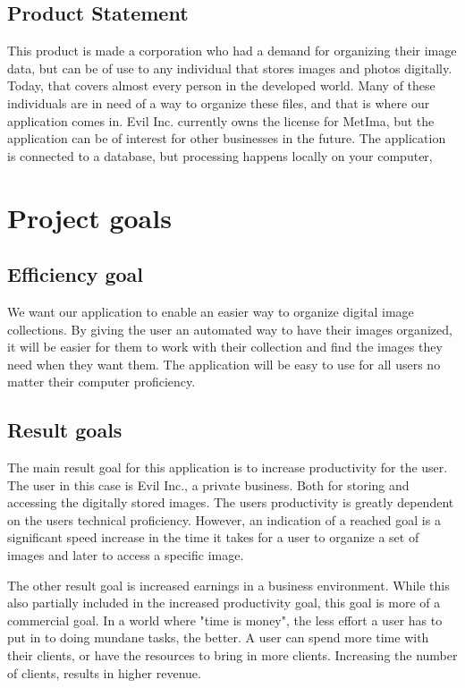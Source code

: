 \documentclass{article}
\begin{document}
\subsection{Product Statement}
This product is made a corporation who had a demand for organizing their image data, but can be of use to any individual that stores images and photos digitally. Today, that covers almost every person in the developed world. Many of these individuals are in need of a way to organize these files, and that is where our application comes in. Evil Inc. currently owns the license for MetIma, but the application can be of interest for other businesses in the future. The application is connected to a database, but processing happens locally on your computer, 

\section{Project goals}

\subsection{Efficiency goal}
We want our application to enable an easier way to organize digital image collections. By giving the user an automated way to have their images organized, it will be easier for them to work with their collection and find the images they need when they want them. The application will be easy to use for all users no matter their computer proficiency.

\subsection{Result goals}
The main result goal for this application is to increase productivity for the user. The user in this case is Evil Inc., a private business. Both for storing and accessing the digitally stored images. The users productivity is greatly dependent on the users technical proficiency. However, an indication of a reached goal is a significant speed increase in the time it takes for a user to organize a set of images and later to access a specific image.

The other result goal is increased earnings in a business environment. While this also partially included in the increased productivity goal, this goal is more of a commercial goal. In a world where "time is money", the less effort a user has to put in to doing mundane tasks, the better. A user can spend more time with their clients, or have the resources to bring in more clients. Increasing the number of clients, results in higher revenue.
\end{document}
